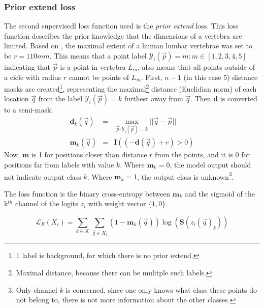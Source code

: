 \subsubsection{Prior extend loss}
The second \Gls{supervisedl} loss function used is the \textit{prior extend} loss.
This loss function describes the prior knowledge that the dimensions of a vertebra are limited. 
Based on \cite{Alam2014}, the maximal extent of a human lumbar vertebrae was set to be $r=110mm$.
This means that a point label $\mathcal{Y}_i(\vec{p})=m: m\in[1,2,3,4,5]$ indicating that $\vec{p}$ is a point in vertebra $L_m$, also means that all points outside of a cicle with radius $r$ cannot be points of $L_m$.
First, $n-1$ (in this case 5) distance masks are created\footnote{1 label is background, for which there is no prior extend.}, 
representing the maximal\footnote{Maximal distance, because there can be mulitple such labels.} distance (Euclidian norm) of each location $\vec{q}$ from the label $\mathcal{Y}_i(\vec{p})=k$ furthest away from $\vec{q}$.
Then $\mathbf{d}$ is converted to a semi-mask:
\begin{eqnarray}
    \mathbf{d}_k(\vec{q}) &=& \max_{\vec{p}:\mathcal{Y}_i(\vec{p})=k}||\vec{q} - \vec{p}||\\
    \mathbf{m}_k(\vec{q}) &=& \mathbf{I}\left( (-\mathbf{d}(\vec{q}) + r) > 0 \right)
\end{eqnarray}
Now, $\mathbf{m}$ is 1 for positions closer than distance $r$ from the points, and it is 0 for positions far from labels with value $k$.
Where $\mathbf{m}_k=0$, the model output should not indicate output class $k$. Where $\mathbf{m}_k=1$, the output class is unknown\footnote{Only channel $k$ is concerned, since one only knows what class these points do not belong to, there is not more information about the other classes.}.

The loss function is the binary cross-entropy between $\mathbf{m}_k$ and the sigmoid of the k$^{th}$ channel of the logits $z_i$ with weight vector $\{1, 0\}$.

\begin{equation}
    \mathcal{L}_E(X_i) = \sum_{k\in\mathcal{K}}\sum_{\vec{q}\in X_i}  (1-\mathbf{m}_k(\vec{q})) \log(\mathbf{S}(z_i(\vec{q})_k)) 
\end{equation}

